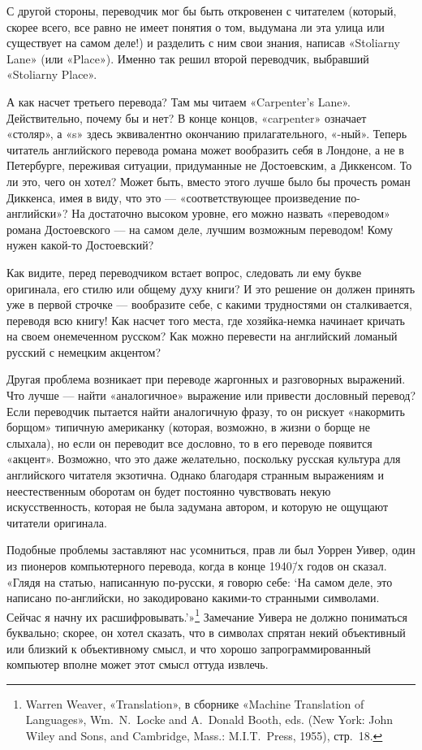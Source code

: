 \documentclass[../main.tex]{subfiles}
\begin{document}
С другой стороны, переводчик мог бы быть откровенен с читателем (который, скорее всего, все равно не имеет понятия о том, выдумана ли эта улица или существует на самом деле!) и разделить с ним свои знания, написав «Stoliarny Lane» (или «Place»). Именно так решил второй переводчик, выбравший «Stoliarny Place».

А как насчет третьего перевода? Там мы читаем «Carpenter's Lane». Действительно, почему бы и нет? В конце концов, «carpenter» означает «столяр», а «s» здесь эквивалентно окончанию прилагательного, «-ный». Теперь читатель английского перевода романа может вообразить себя в Лондоне, а не в Петербурге, переживая ситуации, придуманные не Достоевским, а Диккенсом. То ли это, чего он хотел? Может быть, вместо этого лучше было бы прочесть роман Диккенса, имея в виду, что это --- «соответствующее произведение по-английски»? На достаточно высоком уровне, его можно назвать «переводом» романа Достоевского --- на самом деле, лучшим возможным переводом! Кому нужен какой-то Достоевский?

Как видите, перед переводчиком встает вопрос, следовать ли ему букве оригинала, его стилю или общему духу книги? И это решение он должен принять уже в первой строчке --- вообразите себе, с какими трудностями он сталкивается, переводя всю книгу! Как насчет того места, где хозяйка-немка начинает кричать на своем онемеченном русском? Как можно перевести на английский ломаный русский с немецким акцентом?

Другая проблема возникает при переводе жаргонных и разговорных выражений. Что лучше --- найти «аналогичное» выражение или привести дословный перевод? Если переводчик пытается найти аналогичную фразу, то он рискует «накормить борщом» типичную американку (которая, возможно, в жизни о борще не слыхала), но если он переводит все дословно, то в его переводе появится «акцент». Возможно, что это даже желательно, поскольку русская культура для английского читателя экзотична. Однако благодаря странным выражениям и неестественным оборотам он будет постоянно чувствовать некую искусственность, которая не была задумана автором, и которую не ощущают читатели оригинала.

Подобные проблемы заставляют нас усомниться, прав ли был Уоррен Уивер, один из пионеров компьютерного перевода, когда в конце 1940\=/х годов он сказал. «Глядя на статью, написанную по-русски, я говорю себе: \enquote*{На самом деле, это написано по-английски, но закодировано какими-то странными символами. Сейчас я начну их расшифровывать.}»\footnote{Warren Weaver, «Translation», в сборнике «Machine Translation of Languages», Wm.~N.~Locke and A.~Donald Booth, eds. (New York: John Wiley and Sons, and Cambridge, Mass.: M.I.T.~Press, 1955), стр.~18.} Замечание Уивера не должно пониматься буквально; скорее, он хотел сказать, что в символах спрятан некий объективный или близкий к объективному смысл, и что хорошо запрограммированный компьютер вполне может этот смысл оттуда извлечь.
\end{document}
